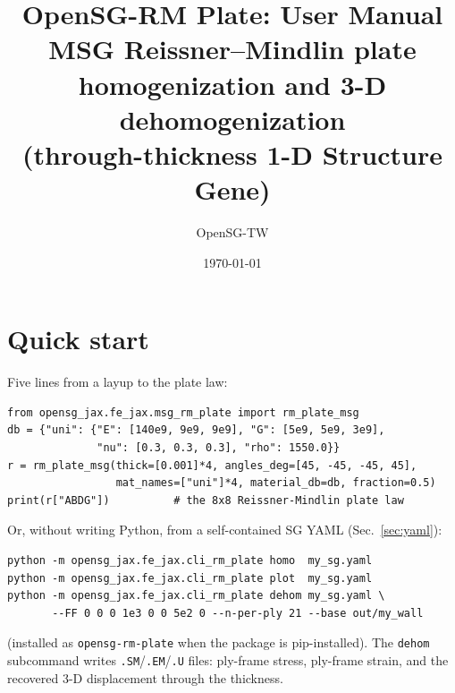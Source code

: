 \documentclass[11pt]{article}
\title{OpenSG-RM Plate: User Manual\\[4pt]
\large MSG Reissner--Mindlin plate homogenization and 3-D dehomogenization\\
(through-thickness 1-D Structure Gene)}
\author{OpenSG-TW}
\date{\today}
\newcommand{\code}[1]{\texttt{#1}}
\begin{document}
\maketitle
\tableofcontents

\section{Quick start}
Five lines from a layup to the plate law:
\begin{verbatim}
from opensg_jax.fe_jax.msg_rm_plate import rm_plate_msg
db = {"uni": {"E": [140e9, 9e9, 9e9], "G": [5e9, 5e9, 3e9],
              "nu": [0.3, 0.3, 0.3], "rho": 1550.0}}
r = rm_plate_msg(thick=[0.001]*4, angles_deg=[45, -45, -45, 45],
                 mat_names=["uni"]*4, material_db=db, fraction=0.5)
print(r["ABDG"])          # the 8x8 Reissner-Mindlin plate law
\end{verbatim}
Or, without writing Python, from a self-contained SG YAML
(Sec.~\ref{sec:yaml}):
\begin{verbatim}
python -m opensg_jax.fe_jax.cli_rm_plate homo  my_sg.yaml
python -m opensg_jax.fe_jax.cli_rm_plate plot  my_sg.yaml
python -m opensg_jax.fe_jax.cli_rm_plate dehom my_sg.yaml \
       --FF 0 0 0 1e3 0 0 5e2 0 --n-per-ply 21 --base out/my_wall
\end{verbatim}
(installed as \code{opensg-rm-plate} when the package is pip-installed).
The \code{dehom} subcommand writes \code{.SM}/\code{.EM}/\code{.U}
files: ply-frame stress, ply-frame strain, and the recovered 3-D
displacement through the thickness.

\end{document}

